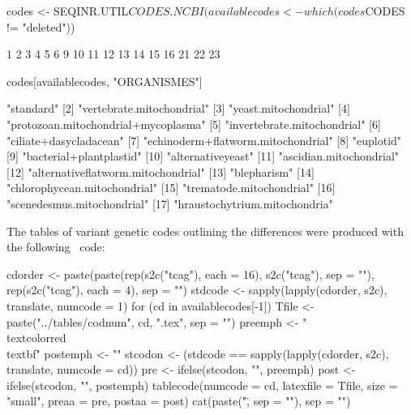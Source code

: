 \documentclass{article}
\begin{document}
\begin{Schunk}
\begin{Sinput}
 codes <- SEQINR.UTIL$CODES.NCBI
 (availablecodes <- which(codes$CODES != "deleted"))
\end{Sinput}
\begin{Soutput}
 [1]  1  2  3  4  5  6  9 10 11 12 13 14 15 16 21 22 23
\end{Soutput}
\begin{Sinput}
 codes[availablecodes, "ORGANISMES"]
\end{Sinput}
\begin{Soutput}
 [1] "standard"                          
 [2] "vertebrate.mitochondrial"          
 [3] "yeast.mitochondrial"               
 [4] "protozoan.mitochondrial+mycoplasma"
 [5] "invertebrate.mitochondrial"        
 [6] "ciliate+dasycladacean"             
 [7] "echinoderm+flatworm.mitochondrial" 
 [8] "euplotid"                          
 [9] "bacterial+plantplastid"            
[10] "alternativeyeast"                  
[11] "ascidian.mitochondrial"            
[12] "alternativeflatworm.mitochondrial" 
[13] "blepharism"                        
[14] "chlorophycean.mitochondrial"       
[15] "trematode.mitochondrial"           
[16] "scenedesmus.mitochondrial"         
[17] "hraustochytrium.mitochondria"      
\end{Soutput}
\end{Schunk}

The tables of variant genetic codes outlining the differences were produced with the
following \Rlogo{}~code:

\begin{Schunk}
\begin{Sinput}
 cdorder <- paste(paste(rep(s2c("tcag"), each = 16), s2c("tcag"), 
     sep = ""), rep(s2c("tcag"), each = 4), sep = "")
 stdcode <- sapply(lapply(cdorder, s2c), translate, numcode = 1)
 for (cd in availablecodes[-1]) {
     Tfile <- paste("../tables/codnum", cd, ".tex", sep = "")
     preemph <- "\\textcolor{red}{\\textbf{"
     postemph <- "}}"
     stcodon <- (stdcode == sapply(lapply(cdorder, s2c), translate, 
         numcode = cd))
     pre <- ifelse(stcodon, "", preemph)
     post <- ifelse(stcodon, "", postemph)
     tablecode(numcode = cd, latexfile = Tfile, size = "small", 
         preaa = pre, postaa = post)
     cat(paste("\", sep = ""), sep = "\n")
 }
\end{Sinput}















\end{Schunk}
\end{document}
